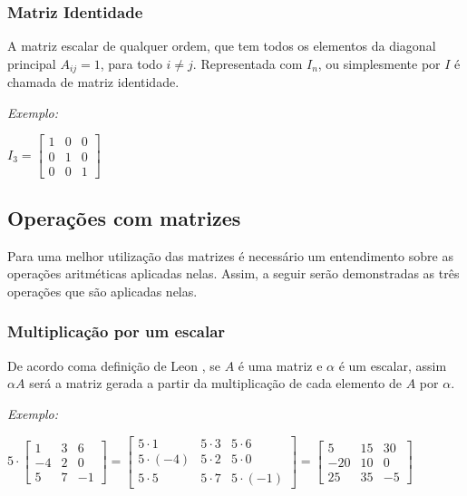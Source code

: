 \subsubsection{Matriz Identidade}
\noindent A matriz escalar de qualquer ordem, que tem todos os elementos da diagonal principal $A{}_{ij} = 1$, para todo $i \neq j$. Representada com $I{}_{n}$, ou simplesmente por $I$ é chamada de matriz identidade.

\textit{Exemplo:}
\begin{center}
    $I_{3} = 
    \begin{bmatrix}
        1 & 0 & 0 \\ 
        0 & 1 & 0 \\ 
        0 & 0 & 1  
    \end{bmatrix}$
\end{center}

\subsection{Operações com matrizes}
\noindent Para uma melhor utilização das matrizes é necessário um entendimento sobre as operações aritméticas aplicadas nelas. Assim, a seguir serão demonstradas as três operações que são aplicadas nelas.

\subsubsection{Multiplicação por um escalar}
\noindent De acordo coma definição de Leon \cite{1998:Leon}, se $A$ é uma matriz e $\alpha$ é um escalar, assim $\alpha A$ será a matriz gerada a partir da multiplicação de cada elemento de $A$ por $\alpha$.

\textit{Exemplo:}
\begin{center}
    $5 \cdot
    \begin{bmatrix}
        1 & 3 & 6 \\ 
        -4 & 2 & 0 \\ 
        5 & 7 & -1  
    \end{bmatrix}
    =
    \begin{bmatrix}
        5 \cdot 1 & 5 \cdot 3 & 5 \cdot 6 \\ 
        5 \cdot (-4) & 5 \cdot 2 & 5 \cdot 0 \\ 
        5 \cdot 5 & 5 \cdot 7 & 5 \cdot (-1)  
    \end{bmatrix}
    =
    \begin{bmatrix}
        5 & 15 & 30 \\ 
        -20 & 10 & 0 \\ 
        25 & 35 & -5
    \end{bmatrix}$
\end{center}

